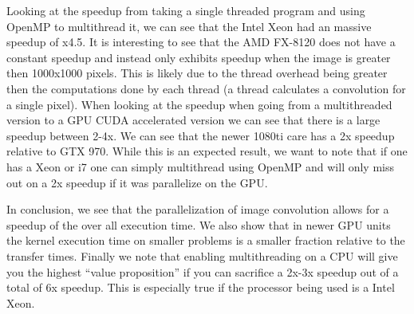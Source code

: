 \documentclass{article}
\begin{document}
\noindent
Looking at the speedup from taking a single threaded program and using OpenMP to multithread it, we can see that the Intel Xeon had an massive speedup of x4.5.
It is interesting to see that the AMD FX-8120 does not have a constant speedup and instead only exhibits speedup when the image is greater then 1000x1000 pixels.
This is likely due to the thread overhead being greater then the computations done by each thread (a thread calculates a convolution for a single pixel).
When looking at the speedup when going from a multithreaded version to a GPU CUDA accelerated version we can see that there is a large speedup between 2-4x.
We can see that the newer 1080ti care has a 2x speedup relative to GTX 970.
While this is an expected result, we want to note that if one has a Xeon or i7 one can simply multithread using OpenMP and will only miss out on a 2x speedup if it was parallelize on the GPU.

In conclusion, we see that the parallelization of image convolution allows for a speedup of the over all execution time.
We also show that in newer GPU units the kernel execution time on smaller problems is a smaller fraction relative to the transfer times.
Finally we note that enabling multithreading on a CPU will give you the highest ``value proposition'' if you can sacrifice a 2x-3x speedup out of a total of 6x speedup.
This is especially true if the processor being used is a Intel Xeon.
\end{document}
